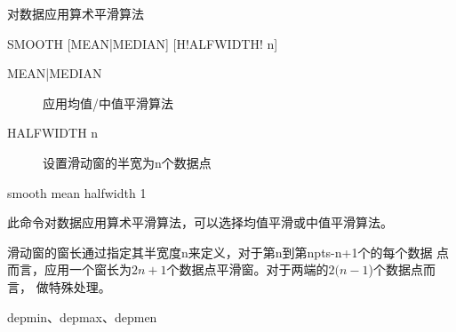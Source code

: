 \label{cmd:smooth}

对数据应用算术平滑算法

\begin{SACSTX}
SMOOTH [MEAN|MEDIAN] [H!ALFWIDTH! n]
\end{SACSTX}

\begin{description}
\item [MEAN|MEDIAN] 应用均值/中值平滑算法
\item [HALFWIDTH n] 设置滑动窗的半宽为n个数据点
\end{description}

\begin{SACDFT}
smooth mean halfwidth 1
\end{SACDFT}

此命令对数据应用算术平滑算法，可以选择均值平滑或中值平滑算法。

滑动窗的窗长通过指定其半宽度n来定义，对于第n到第npts-n+1个的每个数据
点而言，应用一个窗长为$2n+1$个数据点平滑窗。对于两端的$2(n-1$)个数据点而言，
做特殊处理。

depmin、depmax、depmen
